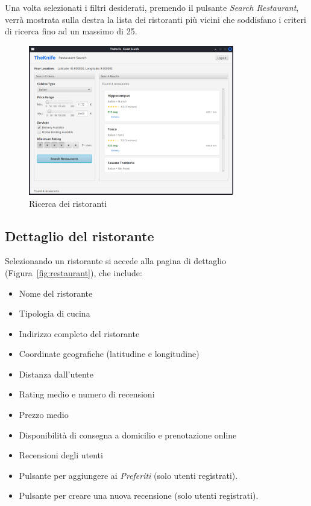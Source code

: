 Una volta selezionati i filtri desiderati, 
premendo il pulsante \emph{Search Restaurant}, verrà
mostrata sulla destra la lista dei ristoranti più vicini 
che soddisfano i criteri di ricerca fino ad un massimo di 25.
\begin{figure}[H]
    \centering
    \includegraphics[width=0.8\textwidth]{images/search2.png}
    \caption{Ricerca dei ristoranti}
    \label{fig:search2}
\end{figure}

\subsection{Dettaglio del ristorante}
Selezionando un ristorante si accede alla pagina di dettaglio (Figura~\ref{fig:restaurant}), che include:
\begin{itemize}
    \item Nome del ristorante
    \item Tipologia di cucina
    \item Indirizzo completo del ristorante
    \item Coordinate geografiche (latitudine e longitudine)
    \item Distanza dall'utente
    \item Rating medio e numero di recensioni
    \item Prezzo medio
    \item Disponibilità di consegna a domicilio e prenotazione online
    \item Recensioni degli utenti
    \item Pulsante per aggiungere ai \emph{Preferiti} (solo utenti registrati).
    \item Pulsante per creare una nuova recensione (solo utenti registrati).
\end{itemize}

